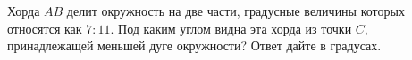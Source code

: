 \begin{ex}
	\begin{condition}
		Хорда \( AB \)  делит окружность на две части, градусные величины которых относятся как \( 7:11 \). Под каким углом видна эта хорда из точки \( C \), принадлежащей меньшей дуге окружности? Ответ дайте в градусах.
	\end{condition}
\end{ex}